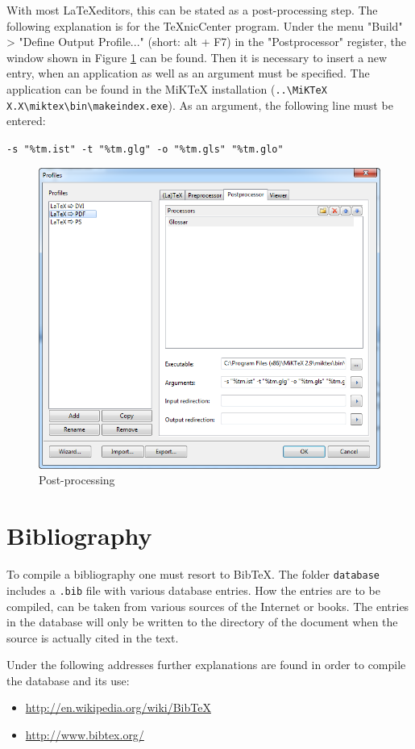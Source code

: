 With most \LaTeX editors, this can be stated as a post-processing step. The following explanation is for the TeXnicCenter program. Under the menu "Build" > "Define Output Profile..." (short: alt + F7) in the "Postprocessor" register, the window shown in Figure \ref{fig:postprocessing} can be found. Then it is necessary to insert a new entry, when an application as well as an argument must be specified. The application can be found in the MiKTeX installation (\texttt{..\textbackslash MiKTeX X.X\textbackslash miktex\textbackslash bin\textbackslash makeindex.exe}). As an argument, the following line must be entered:

\begin{center}
	\texttt{-s \string"\%tm.ist\string" -t \string"\%tm.glg\string" -o \string"\%tm.gls\string" \string"\%tm.glo\string" }
\end{center}

\begin{figure}[H]
	\centering
		\includegraphics[scale=0.6]{images/profiles_glossar.png}
	\caption{Post-processing}
	\label{fig:postprocessing}
\end{figure}


\section{Bibliography}
\label{sec:instructions_bibliography}

To compile a bibliography one must resort to \gls{BibTeX}. The folder \texttt{database} includes a \texttt{.bib} file with various database entries. How the entries are to be compiled, can be taken from various sources of the Internet or books. The entries in the database will only be written to the directory of the document when the source is actually cited in the text.

Under the following addresses further explanations are found in order to compile the database and its use:

\begin{itemize}
	\item \url{http://en.wikipedia.org/wiki/BibTeX}
	\item \url{http://www.bibtex.org/}
\end{itemize}


